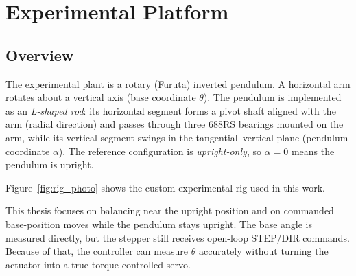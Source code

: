 \section{Experimental Platform}
\label{ch:hardware}

\subsection{Overview}
The experimental plant is a rotary (Furuta) inverted pendulum. A horizontal arm rotates about a vertical axis (base coordinate $\theta$). The pendulum is implemented as an \emph{L-shaped rod}: its horizontal segment forms a pivot shaft aligned with the arm (radial direction) and passes through three 688RS bearings mounted on the arm, while its vertical segment swings in the tangential--vertical plane (pendulum coordinate $\alpha$). The reference configuration is \emph{upright-only}, so $\alpha=0$ means the pendulum is upright.

Figure~\ref{fig:rig_photo} shows the custom experimental rig used in this work.


This thesis focuses on balancing near the upright position and on commanded base-position moves while the pendulum stays upright. The base angle is measured directly, but the stepper still receives open-loop STEP/DIR commands. Because of that, the controller can measure $\theta$ accurately without turning the actuator into a true torque-controlled servo.

